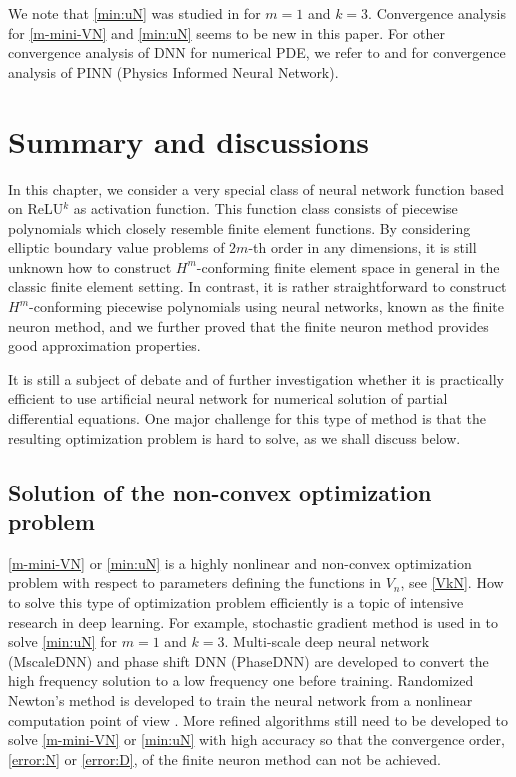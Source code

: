 \begin{remark}
 We note that \eqref{min:uN} was studied in \cite{weinan2018deep} for
 $m=1$ and $k=3$.  Convergence analysis for \eqref{m-mini-VN} and
 \eqref{min:uN} seems to be new in this paper.  For other convergence
 analysis of DNN for numerical PDE, we refer to
 \cite{shin2020convergence} and
 \cite{mishra2020enhancing,mishra2020estimates} for convergence
 analysis of PINN (Physics Informed Neural Network).
\end{remark}   



\section{Summary and discussions} \label{sec:Summary}

In this chapter, we consider a very special class of neural network
function based on ReLU$^k$ as activation function.  This function
class consists of piecewise polynomials which closely resemble finite
element functions.  By considering elliptic boundary value problems of $2m$-th
order in any dimensions, it is still unknown how to construct
$H^m$-conforming finite element space in general in the classic finite
element setting.  In contrast, it is rather straightforward to
construct $H^m$-conforming piecewise polynomials using neural
networks, known as the finite neuron method,  and we further proved
that the finite neuron method provides good approximation
properties. 

It is still a subject of debate and of further investigation whether
it is practically efficient to use artificial neural network for
numerical solution of partial differential equations.  One major
challenge for this type of method is that the resulting optimization
problem is hard to solve, as we shall discuss below.

\subsection{Solution of the non-convex optimization problem}
\eqref{m-mini-VN} or \eqref{min:uN} is a highly nonlinear and
non-convex optimization problem with respect to parameters defining
the functions in $V_n$, see \eqref{VkN}. How to solve this type of
optimization problem efficiently is a topic of intensive research in
deep learning. For example,
stochastic gradient method is used in \cite{weinan2018deep} to solve
\eqref{min:uN} for $m=1$ and $k=3$.  Multi-scale deep neural network
(MscaleDNN) \cite{liu2020multi} and phase shift DNN (PhaseDNN)
\cite{cai2019phase} are developed to convert the high frequency
solution to a low frequency one before training. Randomized Newton's
method is developed to train the neural network from a nonlinear
computation point of view \cite{chen2019randomized}.  More refined
algorithms still need to be developed to solve \eqref{m-mini-VN} or
\eqref{min:uN} with high accuracy so that the convergence order,
\eqref{error:N} or \eqref{error:D}, of the finite neuron
method can not be achieved.

